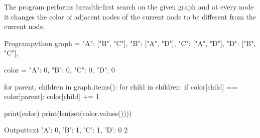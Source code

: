 \documentclass[11pt]{ipu-ai}
\begin{document}
    {The program performs breadth-first search on the given graph and at every node it changes the color of adjacent
    nodes of the current node to be different from the current node.%
        \begin{center}%
        \end{center}\vspace*{2pt}%
    }%
    \begin{code}
        {Program}{python}
graph = {
    "A": ["B", "C"],
    "B": ["A", "D"],
    "C": ["A", "D"],
    "D": ["B", "C"],
}

color = {
    "A": 0,
    "B": 0,
    "C": 0,
    "D": 0
}

for parent, children in graph.items():
    for child in children:
        if color[child] == color[parent]:
            color[child] += 1

print(color)
print(len(set(color.values())))
    \end{code}
    \begin{code}
        {Output}{text}
{'A': 0, 'B': 1, 'C': 1, 'D': 0}
2
    \end{code}
\end{document}
